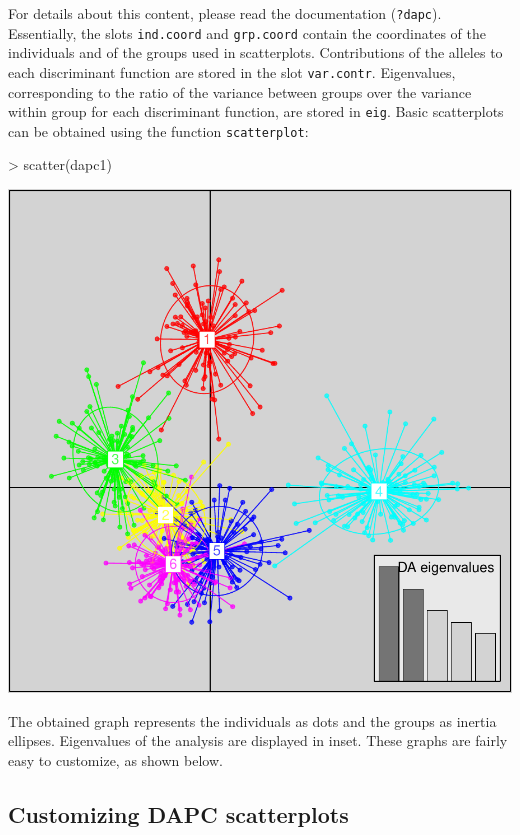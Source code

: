 \documentclass{article}
\begin{document}
For details about this content, please read the documentation (\texttt{?dapc}).
Essentially, the slots \texttt{ind.coord} and \texttt{grp.coord} contain the coordinates of the
individuals and of the groups used in scatterplots.
Contributions of the alleles to each discriminant function are stored in the slot \texttt{var.contr}.
Eigenvalues, corresponding to the ratio of the variance between groups over the variance within
group for each discriminant function, are stored in \texttt{eig}.
Basic scatterplots can be obtained using the function \texttt{scatterplot}:
\begin{Schunk}
\begin{Sinput}
> scatter(dapc1)
\end{Sinput}
\end{Schunk}
\includegraphics{figs/dapc-010}

\noindent The obtained graph represents the individuals as dots and the groups as inertia
ellipses. Eigenvalues of the analysis are displayed in inset. These graphs are fairly easy to
customize, as shown below.




\subsection{Customizing DAPC scatterplots}
\end{document}
